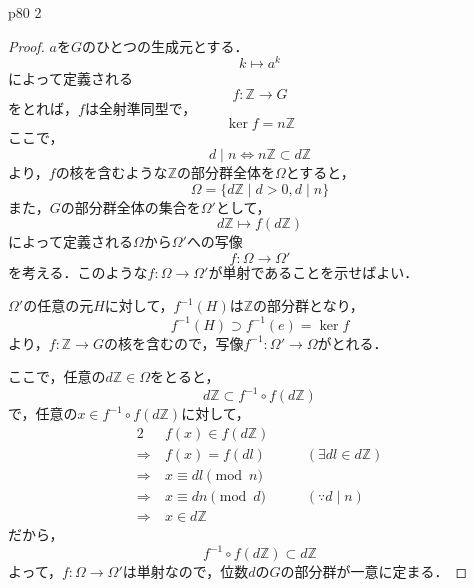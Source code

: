 \documentclass[dvipdfmx,uplatex,11pt]{jsarticle}
\theoremstyle{mytheorem}
\begin{document}
        \newpage 
        p80 2 
        \begin{leftbar}
            \begin{proof}
                $a$を$G$のひとつの生成元とする．
                \[
                    k \longmapsto a^k
                \]
                によって定義される
                \[
                f \colon \mathbb{Z} \longrightarrow G
                \]
                をとれば，$f$は全射準同型で，
                \[
                    \ker f = n \mathbb{Z}
                \]
                ここで，
                \[
                    d \mid n \iff n \mathbb{Z} \subset d \mathbb{Z}
                \]
                より，$f$の核を含むような$\mathbb{Z}$の部分群全体を$\Omega$とすると，
                \[
                    \Omega = \{ d \mathbb{Z} \mid d>0, d \mid n\}
                \]
                また，$G$の部分群全体の集合を$\Omega'$として，
                \[
                    d\mathbb{Z} \longmapsto f(d \mathbb{Z})
                \]
                によって定義される$\Omega$から$\Omega '$への写像
                \[
                    f \colon \Omega \longrightarrow \Omega '
                \]
                を考える．このような$f \colon \Omega \longrightarrow \Omega '$が単射であることを示せばよい．
                
                $\Omega'$の任意の元$H$に対して，$f^{-1}(H)$は$\mathbb{Z}$の部分群となり，
                \[
                    f^{-1}(H) \supset f^{-1}(e)= \ker f
                \]
                より，$f \colon \mathbb{Z} \longrightarrow G$の核を含むので，写像$f^{-1} \colon \Omega ' \longrightarrow \Omega$がとれる．

                ここで，任意の$d \mathbb{Z} \in \Omega$をとると，
                \[
                    d \mathbb{Z} \subset f^{-1} \circ f(d\mathbb{Z})
                \]
                で，任意の$x \in f^{-1} \circ f(d\mathbb{Z})$に対して，
                \begin{alignat*}{2}
                    & f(x) \in f(d\mathbb{Z}) & & \\
                    \Longrightarrow~ & f(x)=f(dl) & \quad & (\exists dl \in d\mathbb{Z}) \\
                    \Longrightarrow ~& x \equiv dl \pmod n& \quad  &  \\
                    \Longrightarrow ~& x \equiv dn \pmod d& \quad &(\because d \mid n) \\
                    \Longrightarrow ~& x \in d \mathbb{Z}
                \end{alignat*}
                だから，
                \[
                    f^{-1} \circ f (d\mathbb{Z}) \subset d \mathbb{Z}
                \]
                よって，$f \colon \Omega \longrightarrow \Omega '$は単射なので，位数$d$の$G$の部分群が一意に定まる．
            \end{proof}
        \end{leftbar}
\end{document}
